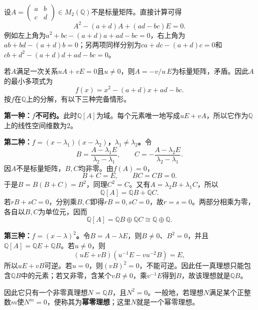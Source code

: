 \begin{example}
设$A=\begin{pmatrix}a&b\\c&d\end{pmatrix}\in M_2(\mathbb Q)$不是标量矩阵。直接计算可得
\[
A^2-(a+d)A+(ad-bc)E=0.
\]
例如左上角为$a^2+bc-(a+d)a+ad-bc=0$，右上角为$ab+bd-(a+d)b=0$；另两项同样分别为$ca+dc-(a+d)c=0$和$cb+d^2-(a+d)d+ad-bc=0$。

若$A$满足一次关系$uA+vE=0$且$u\ne0$，则$A=-v/u\,E$为标量矩阵，矛盾。因此$A$的最小多项式为
\[
f(x)=x^2-(a+d)x+ad-bc.
\]
按$f$在$\mathbb Q$上的分解，有以下三种完备情形。

\textbf{第一种：$f$不可约。}此时$\mathbb Q[A]$为域。每个元素唯一地写成$uE+vA$，所以它作为$\mathbb Q$上的线性空间维数为$2$。

\textbf{第二种：$f=(x-\lambda_1)(x-\lambda_2)$，$\lambda_1\ne\lambda_2$。}令
\[
B=\frac{A-\lambda_1E}{\lambda_2-\lambda_1},\qquad
C=-\frac{A-\lambda_2E}{\lambda_2-\lambda_1}.
\]
因$A$不是标量矩阵，$B,C$均非零。由$f(A)=0$，
\[
B+C=E,\qquad BC=CB=0.
\]
于是$B=B(B+C)=B^2$，同理$C^2=C$。又有$A=\lambda_2B+\lambda_1C$，所以
\[
\mathbb Q[A]=\mathbb QB+\mathbb QC.
\]
若$rB+sC=0$，分别乘$B,C$即得$rB=0,sC=0$，故$r=s=0$。两部分相乘为零，各自以$B,C$为单位元，因而
\[
\mathbb Q[A]=\mathbb QB\oplus\mathbb QC\cong\mathbb Q\oplus\mathbb Q.
\]

\textbf{第三种：$f=(x-\lambda)^2$。}令$B=A-\lambda E$，则$B\ne0$、$B^2=0$，并且$\mathbb Q[A]=\mathbb QE+\mathbb QB$。若$u\ne0$，则
\[
(uE+vB)\left(u^{-1}E-vu^{-2}B\right)=E,
\]
所以$uE+vB$可逆。若$u=0$，则$(vB)^2=0$，不能可逆。因此任一真理想只能包含$\mathbb QB$中的元素；若又非零，含某个$vB\ne0$，乘$v^{-1}E$得到$B$，故该理想就是$\mathbb QB$。

因此它只有一个非零真理想$N=\mathbb QB$，且$N^2=0$。一般地，若理想$N$满足某个正整数$m$使$N^m=0$，便称其为\textbf{幂零理想}；这里$N$就是一个幂零理想。
\end{example}
